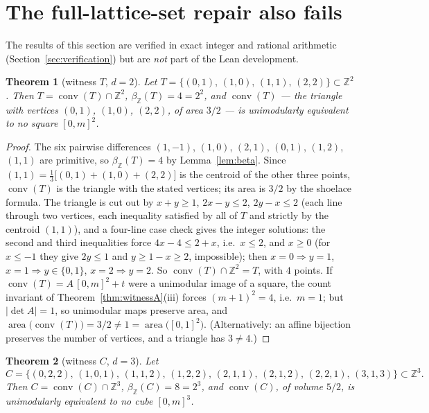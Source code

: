 \documentclass[11pt]{article}
\newtheorem{theorem}{Theorem}[section]
\theoremstyle{remark}
\newcommand{\Z}{\mathbb{Z}}
\newcommand{\conv}{\operatorname{conv}}
\newcommand{\betaZ}{\beta_{\Z}}
\begin{document}
\section{The full-lattice-set repair also fails}\label{sec:repair}

The results of this section are verified in exact integer and rational
arithmetic (Section~\ref{sec:verification}) but are \emph{not} part of the
Lean development.

\begin{theorem}[witness $T$, $d = 2$]\label{thm:witnessB}
Let $T = \{(0,1),\,(1,0),\,(1,1),\,(2,2)\} \subset \Z^2$. Then
$T = \conv(T) \cap \Z^2$, $\betaZ(T) = 4 = 2^2$, and $\conv(T)$ --- the
triangle with vertices $(0,1)$, $(1,0)$, $(2,2)$, of area $3/2$ --- is
unimodularly equivalent to no square $[0,m]^2$.
\end{theorem}

\begin{proof}
The six pairwise differences $(1,-1)$, $(1,0)$, $(2,1)$, $(0,1)$, $(1,2)$,
$(1,1)$ are primitive, so $\betaZ(T) = 4$ by Lemma~\ref{lem:beta}. Since
$(1,1) = \tfrac13\bigl[(0,1) + (1,0) + (2,2)\bigr]$ is the centroid of the
other three points, $\conv(T)$ is the triangle with the stated vertices; its
area is $3/2$ by the shoelace formula. The triangle is cut out by
$x + y \ge 1$, $2x - y \le 2$, $2y - x \le 2$ (each line through two
vertices, each inequality satisfied by all of $T$ and strictly by the
centroid $(1,1)$), and a four-line case check gives the integer solutions:
the second and third inequalities force $4x - 4 \le 2 + x$, i.e.\ $x \le 2$,
and $x \ge 0$ (for $x \le -1$ they give $2y \le 1$ and $y \ge 1 - x \ge 2$,
impossible); then $x = 0 \Rightarrow y = 1$, $x = 1 \Rightarrow y \in
\{0,1\}$, $x = 2 \Rightarrow y = 2$. So $\conv(T) \cap \Z^2 = T$, with $4$
points. If $\conv(T) = A\,[0,m]^2 + t$ were a unimodular image of a square,
the count invariant of Theorem~\ref{thm:witnessA}(iii) forces
$(m+1)^2 = 4$, i.e.\ $m = 1$; but $|{\det A}| = 1$, so unimodular maps
preserve area, and $\operatorname{area}\bigl(\conv(T)\bigr) = 3/2 \neq 1 =
\operatorname{area}\bigl([0,1]^2\bigr)$. (Alternatively: an affine bijection
preserves the number of vertices, and a triangle has $3 \neq 4$.)
\end{proof}

\begin{theorem}[witness $C$, $d = 3$]\label{thm:witnessC}
Let
\[
C = \{(0,2,2),\,(1,0,1),\,(1,1,2),\,(1,2,2),\,(2,1,1),\,(2,1,2),\,(2,2,1),
\,(3,1,3)\} \subset \Z^3 .
\]
Then $C = \conv(C) \cap \Z^3$, $\betaZ(C) = 8 = 2^3$, and $\conv(C)$, of
volume $5/2$, is unimodularly equivalent to no cube $[0,m]^3$.
\end{theorem}
\end{document}
